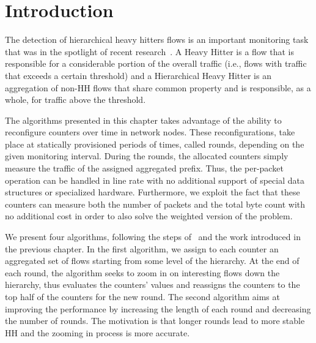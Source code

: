 \section{Introduction}

The detection of hierarchical heavy hitters flows is an important monitoring task that was in the spotlight of recent research~\cite{ben2016heavy, basat2017optimal, ben2017constant, sivaraman2017heavy, HHHOnline, tong2015high}. A Heavy Hitter is a flow that is responsible for a considerable portion of the overall traffic (i.e., flows with traffic that exceeds a certain threshold) and a Hierarchical Heavy Hitter is an aggregation of non-HH flows that share common property and is responsible, as a whole, for traffic above the threshold.

The algorithms presented in this chapter takes advantage of the ability to reconfigure counters over time in network nodes. These reconfigurations, take place at statically provisioned periods of times, called rounds, depending on the given monitoring interval.
During the rounds, the allocated counters simply measure the traffic of the assigned aggregated prefix. Thus, the per-packet operation can be handled in line rate with no additional support of special data structures or specialized hardware. Furthermore, we exploit the fact that these counters can measure both the number of packets and the total byte count with no additional cost in order to also solve the weighted version of the problem.

We present four algorithms, following the steps of~\cite{conf/sigcomm/YuanCM07,Moraney2016} and the work introduced in the previous chapter. In the first algorithm, we assign to each counter an aggregated set of flows starting from some level of the hierarchy. At the end of each round, the algorithm seeks to zoom in on interesting flows down the hierarchy,  thus evaluates the counters' values and reassigns the counters to the top half of the counters for the new round. The second algorithm aims at improving the performance by increasing the length of each round and decreasing the number of rounds. The motivation is that longer rounds lead to more stable HH and the zooming in process is more accurate.

